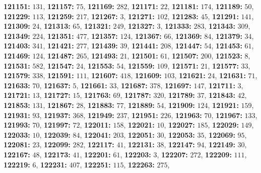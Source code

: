 \textsf{\bfseries 121151:} $131$, \textsf{\bfseries 121157:} $75$, \textsf{\bfseries 121169:} $282$, \textsf{\bfseries 121171:} $22$, \textsf{\bfseries 121181:} $174$, \textsf{\bfseries 121189:} $50$, \textsf{\bfseries 121229:} $113$, \textsf{\bfseries 121259:} $217$, \textsf{\bfseries 121267:} $3$, \textsf{\bfseries 121271:} $102$, \textsf{\bfseries 121283:} $45$, \textsf{\bfseries 121291:} $141$, \textsf{\bfseries 121309:} $24$, \textsf{\bfseries 121313:} $65$, \textsf{\bfseries 121321:} $249$, \textsf{\bfseries 121327:} $3$, \textsf{\bfseries 121333:} $283$, \textsf{\bfseries 121343:} $309$, \textsf{\bfseries 121349:} $224$, \textsf{\bfseries 121351:} $477$, \textsf{\bfseries 121357:} $124$, \textsf{\bfseries 121367:} $66$, \textsf{\bfseries 121369:} $84$, \textsf{\bfseries 121379:} $34$, \textsf{\bfseries 121403:} $341$, \textsf{\bfseries 121421:} $277$, \textsf{\bfseries 121439:} $39$, \textsf{\bfseries 121441:} $208$, \textsf{\bfseries 121447:} $54$, \textsf{\bfseries 121453:} $61$, \textsf{\bfseries 121469:} $124$, \textsf{\bfseries 121487:} $265$, \textsf{\bfseries 121493:} $21$, \textsf{\bfseries 121501:} $61$, \textsf{\bfseries 121507:} $200$, \textsf{\bfseries 121523:} $8$, \textsf{\bfseries 121531:} $582$, \textsf{\bfseries 121547:} $24$, \textsf{\bfseries 121553:} $54$, \textsf{\bfseries 121559:} $109$, \textsf{\bfseries 121571:} $21$, \textsf{\bfseries 121577:} $33$, \textsf{\bfseries 121579:} $338$, \textsf{\bfseries 121591:} $111$, \textsf{\bfseries 121607:} $418$, \textsf{\bfseries 121609:} $103$, \textsf{\bfseries 121621:} $24$, \textsf{\bfseries 121631:} $71$, \textsf{\bfseries 121633:} $70$, \textsf{\bfseries 121637:} $5$, \textsf{\bfseries 121661:} $33$, \textsf{\bfseries 121687:} $378$, \textsf{\bfseries 121697:} $147$, \textsf{\bfseries 121711:} $3$, \textsf{\bfseries 121721:} $13$, \textsf{\bfseries 121727:} $15$, \textsf{\bfseries 121763:} $69$, \textsf{\bfseries 121787:} $320$, \textsf{\bfseries 121789:} $37$, \textsf{\bfseries 121843:} $42$, \textsf{\bfseries 121853:} $131$, \textsf{\bfseries 121867:} $28$, \textsf{\bfseries 121883:} $77$, \textsf{\bfseries 121889:} $54$, \textsf{\bfseries 121909:} $124$, \textsf{\bfseries 121921:} $159$, \textsf{\bfseries 121931:} $93$, \textsf{\bfseries 121937:} $368$, \textsf{\bfseries 121949:} $237$, \textsf{\bfseries 121951:} $226$, \textsf{\bfseries 121963:} $70$, \textsf{\bfseries 121967:} $133$, \textsf{\bfseries 121993:} $70$, \textsf{\bfseries 121997:} $72$, \textsf{\bfseries 122011:} $158$, \textsf{\bfseries 122021:} $10$, \textsf{\bfseries 122027:} $185$, \textsf{\bfseries 122029:} $149$, \textsf{\bfseries 122033:} $10$, \textsf{\bfseries 122039:} $84$, \textsf{\bfseries 122041:} $203$, \textsf{\bfseries 122051:} $30$, \textsf{\bfseries 122053:} $35$, \textsf{\bfseries 122069:} $95$, \textsf{\bfseries 122081:} $23$, \textsf{\bfseries 122099:} $282$, \textsf{\bfseries 122117:} $41$, \textsf{\bfseries 122131:} $38$, \textsf{\bfseries 122147:} $94$, \textsf{\bfseries 122149:} $30$, \textsf{\bfseries 122167:} $48$, \textsf{\bfseries 122173:} $41$, \textsf{\bfseries 122201:} $61$, \textsf{\bfseries 122203:} $3$, \textsf{\bfseries 122207:} $272$, \textsf{\bfseries 122209:} $111$, \textsf{\bfseries 122219:} $6$, \textsf{\bfseries 122231:} $407$, \textsf{\bfseries 122251:} $115$, \textsf{\bfseries 122263:} $275$, 
